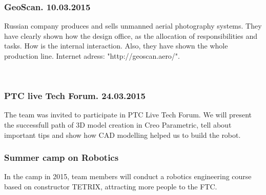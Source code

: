     \subsubsection{GeoScan. 10.03.2015}
    Russian company produces and sells unmanned aerial photography systems. They have clearly shown how the design office, as the allocation of responsibilities and tasks. How is the internal interaction. Also, they have shown the whole production line. Internet adress: "http://geoscan.aero/".
    \begin{figure}[H]
    	\\	
    \end{figure}
	\subsubsection{PTC live Tech Forum. 24.03.2015}
	 The team was invited to participate in PTC Live Tech Forum. We will present the successfull path of 3D model creation in Creo Parametric, tell about important tips and show how CAD modelling helped us to build the robot.
	
	\subsubsection{Summer camp on Robotics}
	In the camp in 2015, team members will conduct a robotics engineering course based on constructor TETRIX, attracting more people to the FTC.
	
	\fillpage
		
		
		
		
		
		
		
		
		
